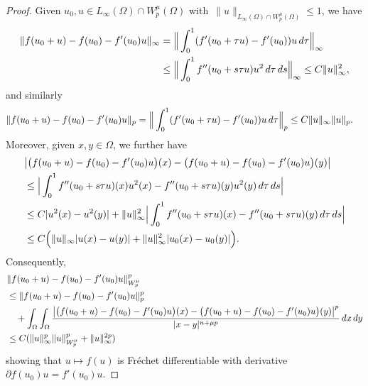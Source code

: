 \documentclass[10pt,a4paper]{amsart}
\begin{document}
\begin{proof}
 Given $u_0,u\in L_\infty(\Omega)\cap W^\mu_p(\Omega)$ with~$\|u\|_{L_\infty(\Omega)\cap W^\mu_p(\Omega)}\leq 1$, we have
\begin{align*}
\|f(u_0+u)-f(u_0)-f'(u_0)u\|_\infty&=\Big\|\int_0^1 (f'(u_0+\tau u)-f'(u_0))u\, {\rm d}\tau\Big\|_\infty\\
&\leq \Big\|\int_0^1 f''(u_0+s\tau u)u^2\, {\rm d}\tau\, {\rm d}s\Big\|_\infty\leq C\|u\|_ \infty^2,
\end{align*}
and similarly
\begin{align*}
\|f(u_0+u)-f(u_0)-f'(u_0)u\|_p&=\Big\|\int_0^1 (f'(u_0+\tau u)-f'(u_0))u\, {\rm d}\tau\Big\|_p\leq C\|u\|_ \infty\|u\|_p.
\end{align*}
Moreover, given $x,y\in\Omega$, we further have
\begin{align*}
&\big|\big(f(u_0+u)-f(u_0)-f'(u_0)u\big)(x)-\big(f(u_0+u)-f(u_0)-f'(u_0)u\big)(y)\big|\\
&\leq\Big|\int_0^1 f''(u_0+s\tau u)(x)u^2(x)-f''(u_0+s\tau u)(y)u^2(y)\, {\rm d}\tau\, {\rm d}s\Big|\\
&\leq C|u^2(x)-u^2(y)|+\|u\|_\infty^2\Big|\int_0^1 f''(u_0+s\tau u)(x)-f''(u_0+s\tau u)(y)\, {\rm d}\tau\, {\rm d}s\Big|\\
&\leq C\Big(\|u\|_\infty|u(x)-u(y)|+\|u\|_\infty^2|u_0(x)-u_0(y)|\Big).
\end{align*}
Consequently,
\begin{align*}
&\|f(u_0+u)-f(u_0)-f'(u_0)u\|_{W_p^\mu}^p\\
&\leq\|f(u_0+u)-f(u_0)-f'(u_0)u\|_p^p\\
&\quad+\int_\Omega\int_\Omega \frac{\big|\big(f(u_0+u)-f(u_0)-f'(u_0)u\big)(x)-\big(f(u_0+u)-f(u_0)-f'(u_0)u\big)(y)\big|^p}{|x-y|^{n+\mu p}}\,{\rm d} x\,{\rm d} y\\
&\leq C(\|u\|_ \infty^p\|u\|_{W_p^\mu}^p+\|u\|_ \infty^{2p})
\end{align*}
showing that  $u\mapsto f(u)$  is Fr\'echet differentiable with  derivative $\partial f(u_0)u=f'(u_0)u$.\medskip



\end{proof}
\end{document}
